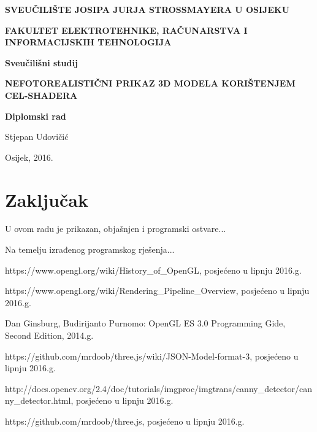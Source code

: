 \documentclass[a4paper,12pt]{extarticle}
\begin{document}
\begin{titlepage}
	\centering
	{\bfseries SVEUČILIŠTE JOSIPA JURJA STROSSMAYERA U OSIJEKU\par}
	{\bfseries FAKULTET ELEKTROTEHNIKE, RAČUNARSTVA I INFORMACIJSKIH TEHNOLOGIJA\par}
	
	\vspace{2cm}
	{\bfseries Sveučilišni studij\par}

	\vspace{4cm}
	{\huge\bfseries NEFOTOREALISTIČNI PRIKAZ 3D MODELA KORIŠTENJEM CEL-SHADERA\par}
	
	\vspace{1cm}
	{\bfseries Diplomski rad\par}
	
	\vspace{2cm}
	{\Large Stjepan Udovičić\par}
	
	\vfill
	{Osijek, 2016.\par}
\end{titlepage}

\tableofcontents











\section{Zaključak}

U ovom radu je prikazan, objašnjen i programski ostvare...


Na temelju izrađenog programskog rješenja...

\begin{thebibliography}{9}

	https://www.opengl.org/wiki/History\_of\_OpenGL, posjećeno u lipnju 2016.g.

	https://www.opengl.org/wiki/Rendering\_Pipeline\_Overview, posjećeno u lipnju 2016.g.
	
	Dan Ginsburg, Budirijanto Purnomo: OpenGL ES 3.0 Programming Gide, Second Edition, 2014.g.

	https://github.com/mrdoob/three.js/wiki/JSON-Model-format-3, posjećeno u lipnju 2016.g.

	http://docs.opencv.org/2.4/doc/tutorials/imgproc/imgtrans/canny\_detector/canny\_detector.html, posjećeno u lipnju 2016.g.

	https://github.com/mrdoob/three.js, posjećeno u lipnju 2016.g.

\end{thebibliography}
\end{document}

